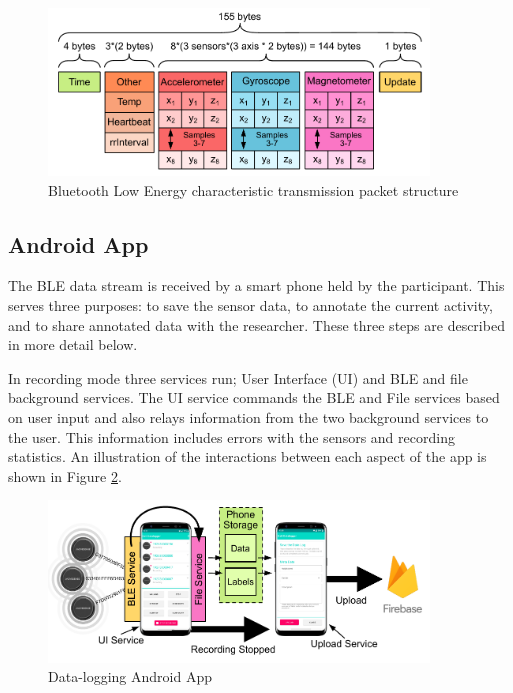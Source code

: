 \begin{figure}[!hbt]
    \centering
    \includegraphics[width=0.9\textwidth]{content/3-Methods/BLE_Bytes_Packets.pdf}
    \caption{Bluetooth Low Energy characteristic transmission packet structure}
    \label{fig:methods-ble-packet-structure}
\end{figure}

\subsection{Android App}
The BLE data stream is received by a smart phone held by the participant. This serves three purposes: to save the sensor data, to annotate the current activity, and to share annotated data with the researcher. These three steps are described in more detail below. 

In recording mode three services run; User Interface (UI) and BLE and file background services. The UI service commands the BLE and File services based on user input and also relays information from the two background services to the user. This information includes errors with the sensors and recording statistics. An illustration of the interactions between each aspect of the app is shown in Figure \ref{fig:methods-android-app}.

\begin{figure}[!hbt]
    \centering
    \includegraphics[width=0.9\textwidth]{content/3-Methods/Android_App.pdf}
    \caption{Data-logging Android App}
    \label{fig:methods-android-app}
\end{figure}

